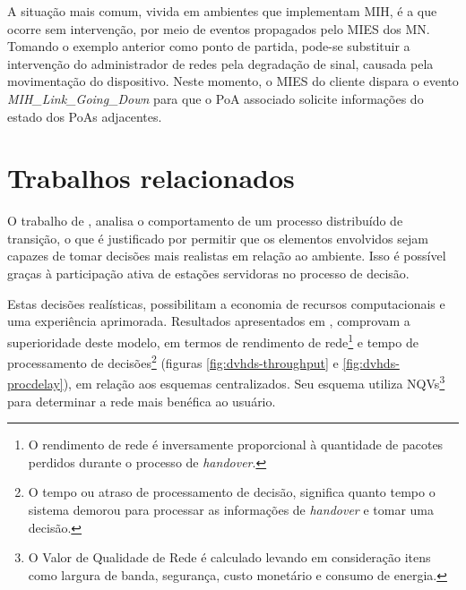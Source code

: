 \documentclass[12pt]{article}
\begin{document}
A situação mais comum, vivida em ambientes que implementam MIH, é a que ocorre 
sem intervenção, por meio de eventos propagados pelo MIES dos MN. Tomando o 
exemplo anterior como ponto de partida, pode-se substituir a intervenção do 
administrador de redes pela degradação de sinal, causada pela movimentação do 
dispositivo. Neste momento, o MIES do cliente dispara o evento 
\textit{MIH\_Link\_Going\_Down} para que o PoA associado solicite informações 
do estado dos PoAs adjacentes.

\section{Trabalhos relacionados} \label{sec:proposta}




O trabalho de \cite{tawil:2008}, analisa o comportamento de um processo 
distribuído de transição, o que é justificado por permitir que os elementos 
envolvidos sejam capazes de tomar decisões mais realistas em relação ao 
ambiente.  Isso é possível graças à participação ativa de estações servidoras 
no processo de decisão.

Estas decisões realísticas, possibilitam a economia de recursos computacionais 
e uma experiência aprimorada.  Resultados apresentados em \cite{tawil:2008}, 
comprovam a superioridade deste modelo, em termos de rendimento de 
rede\footnote{O rendimento de rede é inversamente proporcional à quantidade de 
pacotes perdidos durante o processo de \textit{handover}.} e tempo de 
processamento de decisões\footnote{O tempo ou atraso de processamento de 
decisão, significa quanto tempo o sistema demorou para processar as 
informações de \textit{handover} e tomar uma decisão.} (figuras 
\ref{fig:dvhds-throughput} e \ref{fig:dvhds-procdelay}), em relação aos 
esquemas centralizados. Seu esquema utiliza NQVs\footnote{O Valor de Qualidade 
de Rede é calculado levando em consideração itens como largura de banda, 
segurança, custo monetário e consumo de energia.} para determinar a rede mais 
benéfica ao usuário. 
\end{document}
